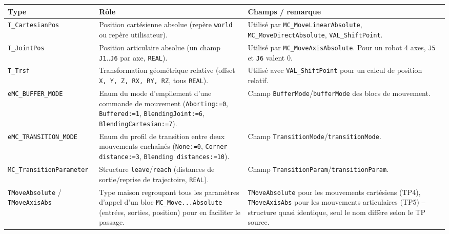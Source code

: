 \begin{center}
    \begin{tabular}{|p{3.4cm}|p{5.8cm}|p{5cm}|}
        \hline
        \textbf{Type} & \textbf{Rôle} & \textbf{Champs / remarque} \\
        \hline
        \texttt{T\_CartesianPos} & Position cartésienne absolue (repère \texttt{world} ou repère utilisateur). & Utilisé par \texttt{MC\_MoveLinearAbsolute}, \texttt{MC\_MoveDirectAbsolute}, \texttt{VAL\_ShiftPoint}. \\
        \hline
        \texttt{T\_JointPos} & Position articulaire absolue (un champ \texttt{J1}..\texttt{J6} par axe, \texttt{REAL}). & Utilisé par \texttt{MC\_MoveAxisAbsolute}. Pour un robot 4 axes, \texttt{J5} et \texttt{J6} valent 0. \\
        \hline
        \texttt{T\_Trsf} & Transformation géométrique relative (offset \texttt{X, Y, Z, RX, RY, RZ}, tous \texttt{REAL}). & Utilisé avec \texttt{VAL\_ShiftPoint} pour un calcul de position relatif. \\
        \hline
        \texttt{eMC\_BUFFER\_MODE} & Enum du mode d'empilement d'une commande de mouvement (\texttt{Aborting:=0}, \texttt{Buffered:=1}, \texttt{BlendingJoint:=6}, \texttt{BlendingCartesian:=7}). & Champ \texttt{BufferMode}/\texttt{bufferMode} des blocs de mouvement. \\
        \hline
        \texttt{eMC\_TRANSITION\_MODE} & Enum du profil de transition entre deux mouvements enchaînés (\texttt{None:=0}, \texttt{Corner distance:=3}, \texttt{Blending distances:=10}). & Champ \texttt{TransitionMode}/\texttt{transitionMode}. \\
        \hline
        \texttt{MC\_TransitionParameter} & Structure \texttt{leave}/\texttt{reach} (distances de sortie/reprise de trajectoire, \texttt{REAL}). & Champ \texttt{TransitionParam}/\texttt{transitionParam}. \\
        \hline
        \texttt{TMoveAbsolute} / \texttt{TMoveAxisAbs} & Type maison regroupant tous les paramètres d'appel d'un bloc \texttt{MC\_Move...Absolute} (entrées, sorties, position) pour en faciliter le passage. & \texttt{TMoveAbsolute} pour les mouvements cartésiens (TP4), \texttt{TMoveAxisAbs} pour les mouvements articulaires (TP5) -- structure quasi identique, seul le nom diffère selon le TP source. \\
        \hline
    \end{tabular}
\end{center}
